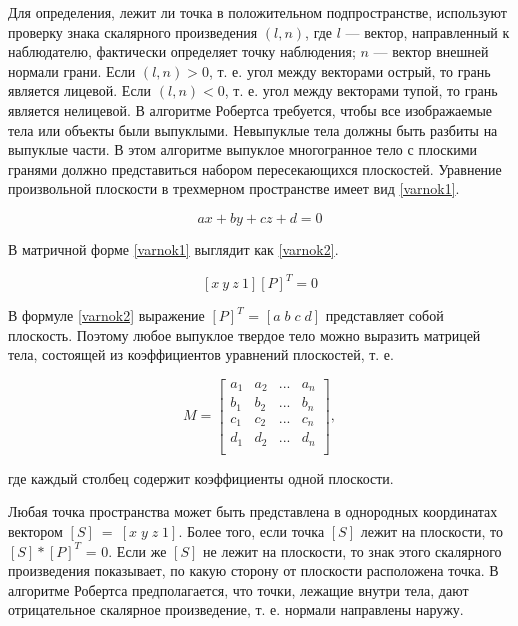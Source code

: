 Для определения, лежит ли точка в положительном подпространстве, используют проверку знака скалярного произведения $(l, n)$, где $l$ --- вектор, направленный к наблюдателю, фактически определяет точку наблюдения; $n$ --- вектор внешней нормали грани. Если $(l, n) > 0$, т. е. угол между векторами острый, то грань является лицевой. Если $(l, n) < 0$, т. е. угол между векторами тупой, то грань является нелицевой.
В алгоритме Робертса требуется, чтобы все изображаемые тела или объекты были выпуклыми. Невыпуклые тела должны быть разбиты на выпуклые части. В этом алгоритме выпуклое многогранное тело с плоскими гранями должно представиться набором пересекающихся плоскостей. Уравнение произвольной плоскости в трехмерном пространстве имеет вид \ref{varnok1}.

\begin{equation}
	\label{varnok1}
	ax+by+cz+d = 0
\end{equation}

В матричной форме \ref{varnok1} выглядит как \ref{varnok2}.

\begin{equation}
	\label{varnok2}
	[x \: y \: z \: 1][P]^T = 0
\end{equation}

В формуле \ref{varnok2} выражение $[P]^T$ = $[a \; b \; c \; d]$ представляет собой плоскость. Поэтому любое выпуклое твердое тело можно выразить матрицей тела, состоящей из коэффициентов уравнений плоскостей, т. е.

\begin{equation}
	M = \begin{bmatrix}
		a_1 & a_2 & ... & a_n           \\[0.3em]
		b_1 & b_2 & ... & b_n           \\[0.3em]
		c_1 & c_2 & ... & c_n           \\[0.3em]
		d_1 & d_2 & ... & d_n           \\[0.3em]
	\end{bmatrix},
\end{equation}

где каждый столбец содержит коэффициенты одной плоскости.

Любая точка пространства может быть представлена в однородных координатах вектором $[S]~=~[x \; y \; z \; 1]$. Более того, если точка $[S]$ лежит на плоскости, то $[S]*[P]^T$ = 0. Если же $[S]$ не лежит на плоскости, то знак этого скалярного произведения показывает, по какую сторону от плоскости расположена точка. В алгоритме Робертса предполагается, что точки, лежащие внутри тела, дают отрицательное скалярное произведение, т. е. нормали направлены наружу. 

